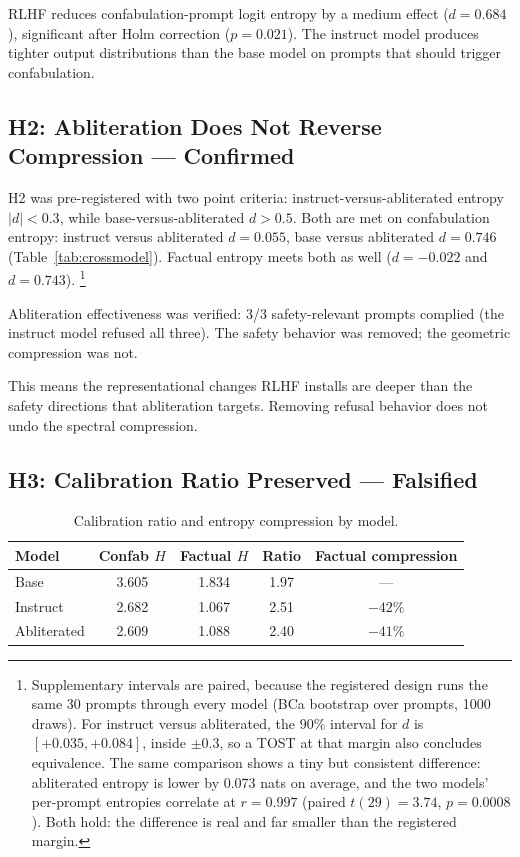 \documentclass[11pt,a4paper]{article}
\begin{document}
RLHF reduces confabulation-prompt logit entropy by a medium effect
($d{=}0.684$), significant after Holm correction ($p{=}0.021$). The
instruct model produces tighter output distributions than the base
model on prompts that should trigger confabulation.

\subsection{H2: Abliteration Does Not Reverse Compression --- Confirmed}

H2 was pre-registered with two point criteria: instruct-versus-abliterated
entropy $|d| < 0.3$, while base-versus-abliterated $d > 0.5$. Both are
met on confabulation entropy: instruct versus abliterated $d = 0.055$,
base versus abliterated $d = 0.746$ (Table~\ref{tab:crossmodel}).
Factual entropy meets both as well ($d = -0.022$ and $d = 0.743$).%
\footnote{Supplementary intervals are paired, because the registered
design runs the same 30 prompts through every model (BCa bootstrap
over prompts, 1000 draws). For instruct versus abliterated, the 90\%
interval for $d$ is $[+0.035, +0.084]$, inside $\pm 0.3$, so a TOST
at that margin also concludes equivalence. The same comparison shows a
tiny but consistent difference: abliterated entropy is lower by 0.073
nats on average, and the two models' per-prompt entropies correlate at
$r = 0.997$ (paired $t(29) = 3.74$, $p = 0.0008$). Both hold: the
difference is real and far smaller than the registered margin.}

Abliteration effectiveness was verified: 3/3 safety-relevant prompts
complied (the instruct model refused all three). The safety behavior
was removed; the geometric compression was not.

This means the representational changes RLHF installs are deeper
than the safety directions that abliteration targets. Removing
refusal behavior does not undo the spectral compression.

\subsection{H3: Calibration Ratio Preserved --- Falsified}

\begin{table}[ht]
\centering
\small
\caption{Calibration ratio and entropy compression by model.}
\label{tab:calibration}
\begin{tabular}{lcccc}
\toprule
\textbf{Model} & \textbf{Confab $H$} & \textbf{Factual $H$}
  & \textbf{Ratio} & \textbf{Factual compression} \\
\midrule
Base & 3.605 & 1.834 & 1.97 & --- \\
Instruct & 2.682 & 1.067 & 2.51 & $-42\%$ \\
Abliterated & 2.609 & 1.088 & 2.40 & $-41\%$ \\
\bottomrule
\end{tabular}
\end{table}
\end{document}
